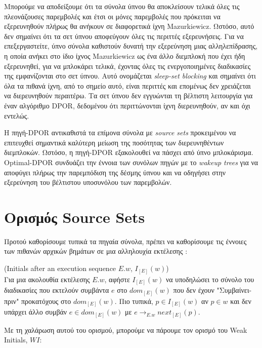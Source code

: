 Μπορούμε να αποδείξουμε \cite{Godefroid1996} ότι τα σύνολα ύπνου θα αποκλείσουν τελικά όλες τις πλεονάζουσες παρεμβολές και έτσι
οι μόνες παρεμβολές που πρόκειται να εξερευνηθούν πλήρως θα ανήκουν σε διαφορετικά ίχνη Mazurkiewicz.
Ωστόσο, αυτό δεν σημαίνει ότι τα σετ ύπνου αποφεύγουν όλες τις περιττές εξερευνήσεις. Για να επεξεργαστείτε, ύπνο σύνολα
καθιστούν δυνατή την εξερεύνηση μιας αλληλεπίδρασης, η οποία ανήκει στο ίδιο ίχνος Mazurkiewicz ως ένα άλλο
διεμπλοκή που έχει ήδη εξερευνηθεί, για να μπλοκάρει τελικά, έχοντας όλες τις ενεργοποιημένες διαδικασίες της
εμφανίζονται στο σετ ύπνου. Αυτό ονομάζεται \textit{sleep-set blocking} και σημαίνει ότι όλα τα πιθανά ίχνη, από το σημείο αυτό,
είναι περιττές και επομένως δεν χρειάζεται να διερευνηθούν περαιτέρω. Τα σετ ύπνου δεν εγγυώνται τη βέλτιστη λειτουργία
για έναν αλγόριθμο DPOR, δεδομένου ότι περιττώνονται ίχνη διερευνηθούν, αν και όχι εντελώς.

Η πηγή-DPOR \cite{AbdullaAronisJohnssonSagonasDPOR2014} αντικαθιστά τα επίμονα σύνολα με \textit{source sets} προκειμένου να επιτευχθεί
σημαντικά καλύτερη μείωση της ποσότητας των διερευνηθέντων διεμπλοκών. Ωστόσο, η πηγή-DPOR εξακολουθεί να πάσχει από ύπνο
μπλοκάρισμα. Optimal-DPOR \cite{AbdullaAronisJohnssonSagonasDPOR2014}
συνδυάζει την έννοια των συνόλων πηγών με το \textit{wakeup trees} για να αποφύγει πλήρως την παρεμπόδιση της δέσμης ύπνου και να οδηγήσει στην εξερεύνηση
του βέλτιστου υποσυνόλου των παρεμβολών.

\section{Ορισμός Source Sets}

Προτού καθορίσουμε τυπικά τα πηγαία σύνολα, πρέπει να καθορίσουμε τις έννοιες
των πιθανών αρχικών βημάτων σε μια αλληλουχία εκτέλεσης \cite{AbdullaAronisJohnssonSagonasDPOR2014}:

\begin{definition}{(Initials after an execution sequence $E.w$, $I_{[E]}(w)$)}\\
Για μια ακολουθία εκτέλεσης $E.w$, αφήστε $I_{[E]}(w)$ να υποδηλώσει το σύνολο του
διαδικασίες που εκτελούν συμβάντα $e$ στο $dom_{[E]}(w)$ που δεν έχουν
"Συμβαίνει-πριν" προκατόχους στο $dom_{[E]}(w)$. Πιο τυπικά,
$p \in I_{[E]}(w)$ αν $p \in w$ και δεν υπάρχει άλλο συμβάν $e \in dom_{[E]}(w)$ με
$e \rightarrow_{E.w} next_{[E]}(p)$.
\end{definition}

Με τη χαλάρωση αυτού του ορισμού, μπορούμε να πάρουμε τον ορισμό του Weak Initials, $WI$:

